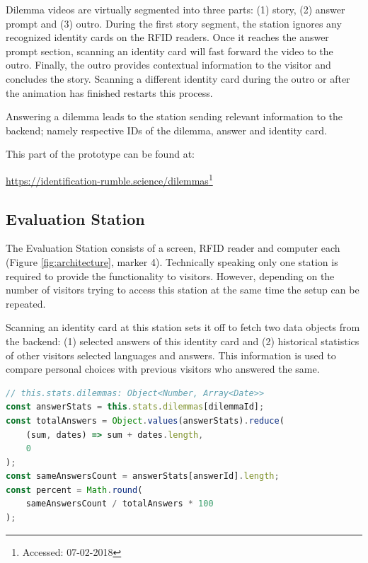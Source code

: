 Dilemma videos are virtually segmented into three parts:
(1) story, (2) answer prompt and (3) outro.
During the first story segment, the station ignores any recognized identity cards on the RFID readers.
Once it reaches the answer prompt section, scanning an identity card will fast forward the video to the outro.
Finally, the outro provides contextual information to the visitor and concludes the story.
Scanning a different identity card during the outro or after the animation has finished restarts this process.

Answering a dilemma leads to the station sending relevant information to the backend; namely respective IDs of the dilemma, answer and identity card.

This part of the prototype can be found at:

\begin{flushleft}
  \url{https://identification-rumble.science/dilemmas}\footnote{Accessed: 07-02-2018}
\end{flushleft}


\subsection{Evaluation Station} \label{sec:evaluationstation}
The Evaluation Station consists of a screen, RFID reader and computer each (Figure \ref{fig:architecture}, marker 4).
Technically speaking only one station is required to provide the functionality to visitors.
However, depending on the number of visitors trying to access this station at the same time the setup can be repeated.

Scanning an identity card at this station sets it off to fetch two data objects from the backend: (1) selected answers of this identity card and (2) historical statistics of other visitors selected languages and answers.
This information is used to compare personal choices with previous visitors who answered the same.

\begin{lstlisting}[caption={Calculating percentage of visitors who answered the same}, label={lst:samepercentage}, language=JavaScript]
// this.stats.dilemmas: Object<Number, Array<Date>>
const answerStats = this.stats.dilemmas[dilemmaId];
const totalAnswers = Object.values(answerStats).reduce(
    (sum, dates) => sum + dates.length,
    0
);
const sameAnswersCount = answerStats[answerId].length;
const percent = Math.round(
    sameAnswersCount / totalAnswers * 100
);
\end{lstlisting}

